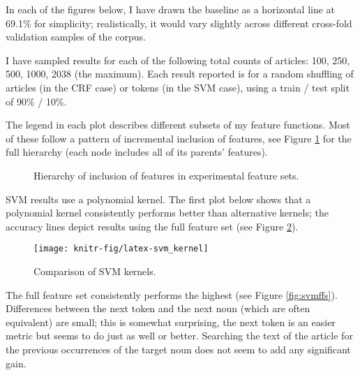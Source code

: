 \documentclass[11pt]{article}\usepackage{graphicx, color}
\newenvironment{knitrout}{}{} %
\begin{document}
In each of the figures below, I have drawn the baseline as a horizontal line at 69.1\% for simplicity; realistically, it would vary slightly across different cross-fold validation samples of the corpus.

I have sampled results for each of the following total counts of articles: 100, 250, 500, 1000, 2038 (the maximum). Each result reported is for a random shuffling of articles (in the CRF case) or tokens (in the SVM case), using a train / test split of 90\% / 10\%.

The legend in each plot describes different subsets of my feature functions. Most of these follow a pattern of incremental inclusion of features, see Figure \ref{fig:features} for the full hierarchy (each node includes all of its parents' features).

\begin{figure}
  \centering
  \caption{Hierarchy of inclusion of features in experimental feature sets.}\label{fig:features}
\end{figure}

SVM results use a polynomial kernel. The first plot below shows that a polynomial kernel consistently performs better than alternative kernels; the accuracy lines depict results using the full feature set (see Figure \ref{fig:svmkernel}).

\begin{figure}
\begin{knitrout}\small
{}\color{fgcolor}

{\centering \texttt{[image: knitr-fig/latex-svm\_kernel]} 

}



\end{knitrout}

  \caption{Comparison of SVM kernels.}\label{fig:svmkernel}
\end{figure}

The full feature set consistently performs the highest (see Figure \ref{fig:svmffs}). Differences between the next token and the next noun (which are often equivalent) are small; this is somewhat surprising, the next token is an easier metric but seems to do just as well or better. Searching the text of the article for the previous occurrences of the target noun does not seem to add any significant gain.
\end{document}
